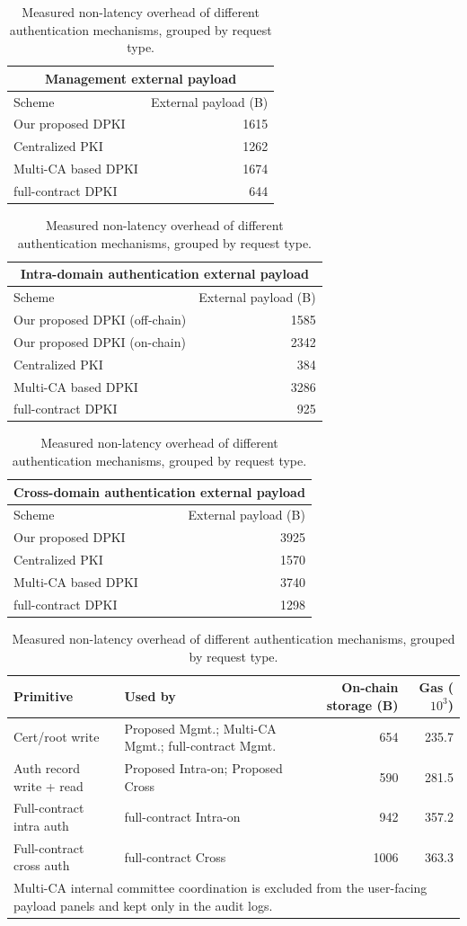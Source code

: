 \begin{table}[t]
\centering
\caption{Measured non-latency overhead of different authentication mechanisms, grouped by request type.}
\label{tab:resource-overhead-v3}
\scriptsize
\setlength{\tabcolsep}{4.0pt}

\begin{tabular}{lr}
\hline
\multicolumn{2}{c}{Management external payload} \\
\hline
Scheme & External payload (B) \\
\hline
Our proposed DPKI & 1615 \\
Centralized PKI & 1262 \\
Multi-CA based DPKI & 1674 \\
full-contract DPKI & 644 \\
\hline
\end{tabular}
\hfill
\begin{tabular}{lr}
\hline
\multicolumn{2}{c}{Intra-domain authentication external payload} \\
\hline
Scheme & External payload (B) \\
\hline
Our proposed DPKI (off-chain) & 1585 \\
Our proposed DPKI (on-chain) & 2342 \\
Centralized PKI & 384 \\
Multi-CA based DPKI & 3286 \\
full-contract DPKI & 925 \\
\hline
\end{tabular}
\hfill
\begin{tabular}{lr}
\hline
\multicolumn{2}{c}{Cross-domain authentication external payload} \\
\hline
Scheme & External payload (B) \\
\hline
Our proposed DPKI & 3925 \\
Centralized PKI & 1570 \\
Multi-CA based DPKI & 3740 \\
full-contract DPKI & 1298 \\
\hline
\end{tabular}

\vspace{0.6em}

\begin{tabular}{llrr}
\hline
Primitive & Used by & On-chain storage (B) & Gas ($10^3$) \\
\hline
Cert/root write & Proposed Mgmt.; Multi-CA Mgmt.; full-contract Mgmt. & 654 & 235.7 \\
Auth record write + read & Proposed Intra-on; Proposed Cross & 590 & 281.5 \\
Full-contract intra auth & full-contract Intra-on & 942 & 357.2 \\
Full-contract cross auth & full-contract Cross & 1006 & 363.3 \\
\hline
\multicolumn{4}{l}{\footnotesize Multi-CA internal committee coordination is excluded from the user-facing payload panels and kept only in the audit logs.}
\end{tabular}
\end{table}
